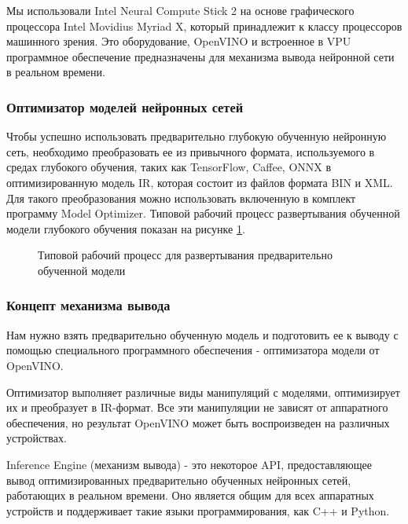 \documentclass[12pt,a4paper]{scrartcl}
\begin{document}
			Мы использовали Intel Neural Compute Stick 2 на основе графического процессора Intel Movidius Myriad X, который принадлежит к классу процессоров машинного зрения. Это оборудование, OpenVINO и встроенное в VPU программное обеспечение предназначены для механизма вывода нейронной сети в реальном времени.
		
		\subsubsection{Оптимизатор моделей нейронных сетей}
		
			Чтобы успешно использовать предварительно глубокую обученную нейронную сеть, необходимо преобразовать ее из привычного формата, используемого в средах глубокого обучения, таких как TensorFlow, Caffee, ONNX в оптимизированную модель IR, которая состоит из файлов формата BIN и XML. Для такого преобразования можно использовать включенную в комплект программу Model Optimizer. Типовой рабочий процесс развертывания обученной модели глубокого обучения показан на рисунке \ref{fig:Model_Optimizer_Structure}\cite{bib:Model_Optimizer_Dev_Guide}.
			
			\begin{figure}[h]
				\caption{Типовой рабочий процесс для развертывания предварительно обученной модели}
				\label{fig:Model_Optimizer_Structure}
			\end{figure}
		
		\subsubsection{Концепт механизма вывода}
		
			Нам нужно взять предварительно обученную модель и подготовить ее к выводу с помощью специального программного обеспечения - оптимизатора модели от OpenVINO.
			
			Оптимизатор выполняет различные виды манипуляций с моделями, оптимизирует их и преобразует в IR-формат. Все эти манипуляции не зависят от аппаратного обеспечения, но результат OpenVINO может быть воспроизведен на различных устройствах\cite{bib:Deep_Learning_Computer_Vision}.	
			
			Inference Engine (механизм вывода) - это некоторое API, предоставляющее вывод оптимизированных предварительно обученных нейронных сетей, работающих в реальном времени. Оно является общим для всех аппаратных устройств и поддерживает такие языки программирования, как C++ и Python.
			
\end{document}
